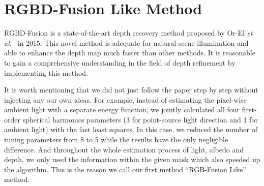 \section{RGBD-Fusion Like Method}
RGBD-Fusion is a state-of-the-art depth recovery method proposed by Or-El \emph{et al.}~\cite{or2015rgbd} in 2015.
This novel method is adequate for natural scene illumination and able to enhance the depth map much faster than other methods.
It is reasonable to gain a comprehensive understanding in the field of depth refinement by implementing this method.

It is worth mentioning that we did not just follow the paper step by step without injecting any our own ideas.
For example, instead of estimating the pixel-wise ambient light with a separate energy function, we jointly calculated all four first-order spherical harmonics parameters (3 for point-source light direction and 1 for ambient light) with the fast least squares.
In this case, we reduced the number of tuning parameters from 8 to 5 while the results have the only negligible difference.
And throughout the whole estimation process of light, albedo and depth, we only used the information within the given mask which also speeded up the algorithm.
This is the reason we call our first method ``RGB-Fusion Like'' method.

